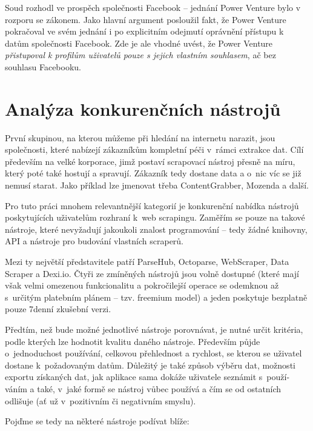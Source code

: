 \documentclass[thesis=B,czech]{FITthesis}[2012/06/26]
\begin{document}
Soud rozhodl ve prospěch společnosti Facebook -- jednání Power Venture bylo v rozporu se zákonem. Jako hlavní argument posloužil fakt, že Power Venture pokračoval ve svém jednání i po explicitním odejmutí oprávnění přístupu k datům společnosti Facebook. Zde je ale vhodné uvést, že Power Venture \emph{přistupoval k profilům uživatelů pouze s jejich vlastním souhlasem}, ač bez souhlasu Facebooku.\cite{facebook_venture_2}


\newpage
\section{Analýza konkurenčních nástrojů}
První skupinou, na kterou můžeme při hledání na internetu narazit, jsou společnosti, které nabízejí zákazníkům kompletní péči v~rámci extrakce dat. Cílí především na velké korporace, jimž postaví scrapovací nástroj přesně na míru, který poté také hostují a spravují. Zákazník tedy dostane data a o~nic víc se již nemusí starat. Jako příklad lze jmenovat třeba ContentGrabber, Mozenda a další.

Pro tuto práci mnohem relevantnější kategorií je konkurenční nabídka nástrojů poskytujících uživatelům rozhraní k~web scrapingu. Zaměřím se pouze na takové nástroje, které nevyžadují jakoukoli znalost programování -- tedy žádné knihovny, API a nástroje pro budování vlastních scraperů.

Mezi ty největší představitele patří ParseHub, Octoparse, WebScraper, Data Scraper a Dexi.io. Čtyři ze zmíněných nástrojů jsou volně dostupné (které mají však velmi omezenou funkcionalitu a pokročilejší operace se odemknou až s~určitým platebním plánem -- tzv. freemium model) a jeden poskytuje bezplatně pouze 7denní zkušební verzi.

Předtím, než bude možné jednotlivé nástroje porovnávat, je nutné určit kritéria, podle kterých lze hodnotit kvalitu daného nástroje. Především půjde o~jednoduchost používání, celkovou přehlednost a rychlost, se kterou se uživatel dostane k~požadovaným datům. Důležitý je také způsob výběru dat, možnosti exportu získaných dat, jak aplikace sama dokáže uživatele seznámit s~použí-váním a také, v~jaké formě se nástroj vůbec používá a čím se od ostatních odlišuje (ať už v~pozitivním či negativním smyslu). 

Poj\v{d}me se tedy na některé nástroje podívat blíže:
\end{document}
